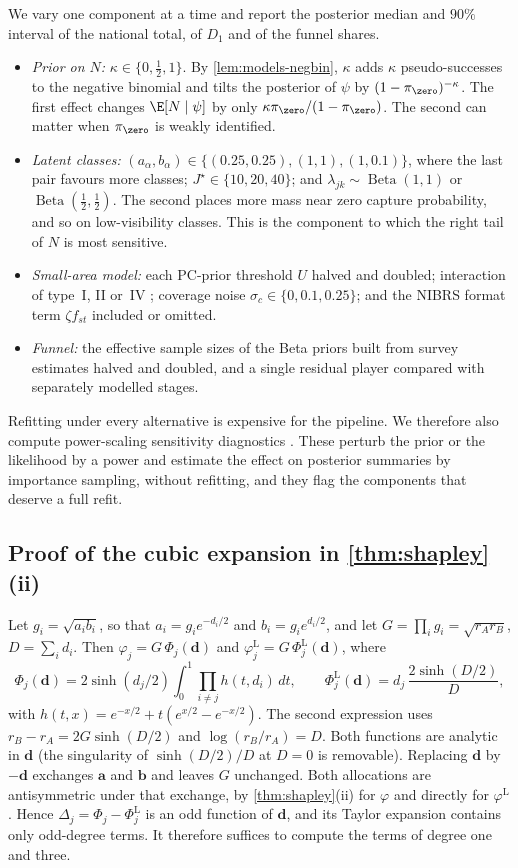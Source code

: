 We vary one component at a time and report the posterior median and $90\%$ interval of the national total, of $D_1$ and of the funnel shares.
\begin{itemize}
  \item \emph{Prior on $N$:} $\kappa\in\{0,\tfrac12,1\}$. By \cref{lem:models-negbin}, $\kappa$ adds $\kappa$ pseudo-successes to the negative binomial and tilts the posterior of $\psi$ by $(1-\pi_{\zero})^{-\kappa}$. The first effect changes $\E[N\mid\psi]$ by only $\kappa\pi_{\zero}/(1-\pi_{\zero})$. The second can matter when $\pi_{\zero}$ is weakly identified.
  \item \emph{Latent classes:} $(a_\alpha,b_\alpha)\in\{(0.25,0.25),(1,1),(1,0.1)\}$, where the last pair favours more classes; $J^\star\in\{10,20,40\}$; and $\lambda_{jk}\sim\operatorname{Beta}(1,1)$ or $\operatorname{Beta}(\tfrac12,\tfrac12)$. The second places more mass near zero capture probability, and so on low-visibility classes. This is the component to which the right tail of $N$ is most sensitive.
  \item \emph{Small-area model:} each PC-prior threshold $U$ halved and doubled; interaction of type~I, II or~IV \citep{knorrheld2000}; coverage noise $\sigma_c\in\{0,0.1,0.25\}$; and the NIBRS format term $\zeta f_{st}$ included or omitted.
  \item \emph{Funnel:} the effective sample sizes of the Beta priors built from survey estimates halved and doubled, and a single residual player compared with separately modelled stages.
\end{itemize}
Refitting under every alternative is expensive for the pipeline. We therefore also compute power-scaling sensitivity diagnostics \citep{kallioinen2024}. These perturb the prior or the likelihood by a power and estimate the effect on posterior summaries by importance sampling, without refitting, and they flag the components that deserve a full refit.

\subsection{Proof of the cubic expansion in \texorpdfstring{\cref{thm:shapley}}{Theorem}(ii)}\label{app:bayes-proofs}

Let $g_i=\sqrt{a_ib_i}$, so that $a_i=g_ie^{-d_i/2}$ and $b_i=g_ie^{d_i/2}$, and let $G=\prod_ig_i=\sqrt{r_Ar_B}$, $D=\sum_id_i$. Then $\varphi_j=G\,\Phi_j(\bm d)$ and $\varphi^{\mathrm L}_j=G\,\Phi^{\mathrm L}_j(\bm d)$, where
\[
  \Phi_j(\bm d)=2\sinh(d_j/2)\int_0^1\prod_{i\ne j}h(t,d_i)\,dt,
  \qquad
  \Phi^{\mathrm L}_j(\bm d)=d_j\,\frac{2\sinh(D/2)}{D},
\]
with $h(t,x)=e^{-x/2}+t(e^{x/2}-e^{-x/2})$.
The second expression uses $r_B-r_A=2G\sinh(D/2)$ and $\log(r_B/r_A)=D$. Both functions are analytic in $\bm d$ (the singularity of $\sinh(D/2)/D$ at $D=0$ is removable). Replacing $\bm d$ by $-\bm d$ exchanges $\bm a$ and $\bm b$ and leaves $G$ unchanged. Both allocations are antisymmetric under that exchange, by \cref{thm:shapley}(ii) for $\varphi$ and directly for $\varphi^{\mathrm L}$. Hence $\Delta_j=\Phi_j-\Phi_j^{\mathrm L}$ is an odd function of $\bm d$, and its Taylor expansion contains only odd-degree terms. It therefore suffices to compute the terms of degree one and three.

